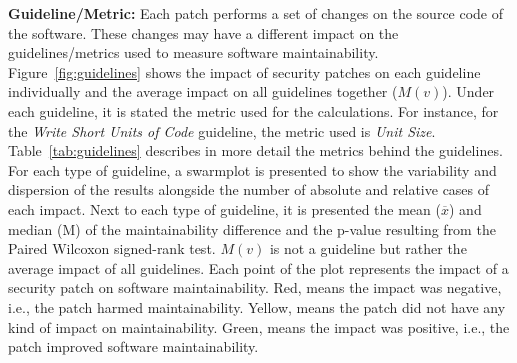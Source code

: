 \documentclass[smallextended]{svjour3}       %
\begin{document}
\textbf{Guideline/Metric:} Each patch performs a set of changes
on the source code of the software. These changes may have a 
different impact on the guidelines/metrics used to measure software 
maintainability. Figure~\ref{fig:guidelines} shows the impact of 
security patches on each guideline individually and the average 
impact on all guidelines together ($M(v)$). Under each guideline, it 
is stated the metric used for the calculations. For instance, for the 
\emph{Write Short Units of Code} guideline, the metric used is 
\emph{Unit Size}. Table~\ref{tab:guidelines} describes in more 
detail the metrics behind the guidelines. For each type of 
guideline, a swarmplot is presented to show the variability and 
dispersion of the results alongside the number of absolute and 
relative cases of each impact. Next to each type of guideline, it is 
presented the mean ($\overline{x}$) and median (M) of the 
maintainability difference and the p-value resulting from the Paired 
Wilcoxon signed-rank test. $M(v)$ is not a guideline but rather the 
average impact of all guidelines. Each point of the plot represents 
the impact of a security patch on software maintainability. Red, 
means the impact was negative, i.e., the patch harmed 
maintainability. Yellow, means the patch did not have any kind of 
impact on maintainability. Green, means the impact was positive, i.e., 
the patch improved software maintainability.
\end{document}
